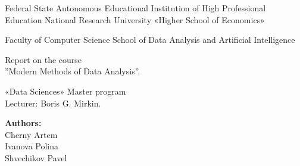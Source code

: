 \documentclass{article}\usepackage[]{graphicx}\usepackage[]{color}
\begin{document}
\begin{center}
Federal State Autonomous Educational Institution
of High Professional Education
National Research University «Higher School of Economics»
\end{center}

\begin{center}
Faculty of Computer Science
School of Data Analysis and Artificial Intelligence
\end{center}

\vspace*{3 cm}

\begin{center} \huge
Report on the course \\ 
''Modern Methods of Data Analysis''.
\end{center}


\vspace*{1.5 cm}

\begin{center} \large
«Data Sciences» Master program \\
Lecturer: Boris G. Mirkin.
\end{center}


\begin{center} \large
\textbf{Authors:}\\
Cherny Artem \\
Ivanova Polina \\
Shvechikov Pavel \\
\end{center}
 


\newpage


\clearpage




\end{document}
